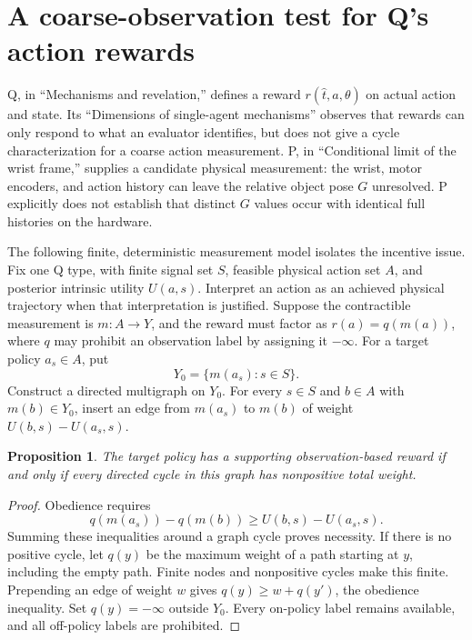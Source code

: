 \documentclass{article}
\newtheorem{proposition}{Proposition}
\begin{document}
\section*{A coarse-observation test for Q's action rewards}

Q, in ``Mechanisms and revelation,'' defines a reward \(r(\hat t,a,\theta)\)
on actual action and state. Its ``Dimensions of single-agent mechanisms''
observes that rewards can only respond to what an evaluator identifies, but
does not give a cycle characterization for a coarse action measurement. P,
in ``Conditional limit of the wrist frame,'' supplies a candidate physical
measurement: the wrist, motor encoders, and action history can leave the
relative object pose \(G\) unresolved. P explicitly does not establish that
distinct \(G\) values occur with identical full histories on the hardware.

The following finite, deterministic measurement model isolates the incentive
issue. Fix one Q type, with finite signal set \(S\), feasible physical action
set \(A\), and posterior intrinsic utility \(U(a,s)\). Interpret an action as
an achieved physical trajectory when that interpretation is justified.
Suppose the contractible measurement is \(m:A\to Y\), and the reward must
factor as \(r(a)=q(m(a))\), where \(q\) may prohibit an observation label by
assigning it \(-\infty\). For a target policy \(a_s\in A\), put
\[
Y_0=\{m(a_s):s\in S\}.
\]
Construct a directed multigraph on \(Y_0\). For every \(s\in S\) and
\(b\in A\) with \(m(b)\in Y_0\), insert an edge from \(m(a_s)\) to
\(m(b)\) of weight \(U(b,s)-U(a_s,s)\).

\begin{proposition}
The target policy has a supporting observation-based reward if and only if
every directed cycle in this graph has nonpositive total weight.
\end{proposition}

\begin{proof}
Obedience requires
\[
q(m(a_s))-q(m(b))\geq U(b,s)-U(a_s,s).
\]
Summing these inequalities around a graph cycle proves necessity. If there
is no positive cycle, let \(q(y)\) be the maximum weight of a path starting
at \(y\), including the empty path. Finite nodes and nonpositive cycles
make this finite. Prepending an edge of weight \(w\) gives
\(q(y)\geq w+q(y')\), the obedience inequality. Set \(q(y)=-\infty\)
outside \(Y_0\). Every on-policy label remains available, and all
off-policy labels are prohibited.
\end{proof}
\end{document}
